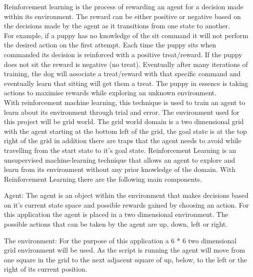 Reinforcement learning is the process of rewarding an agent for a decision made within its environment. The reward can be either positive or negative based on the decisions made by the agent as it transitions from one state to another.\\
For example, if a puppy has no knowledge of the sit command it will not perform the desired action on the first attempt. Each time the puppy sits when commanded its decision is reinforced with a positive treat/reward. If the puppy does not sit the reward is negative (no treat). Eventually after many iterations of training, the dog will associate a treat/reward with that specific command and eventually learn that sitting will get them a treat. 
The puppy in essence is taking actions to maximise rewards while exploring an unknown environment.\\
With reinforcement machine learning, this technique is used to train an agent to learn about its environment through trial and error.
The environment used for this project will be grid world. The  grid world domain is a two dimensional grid with the agent starting at the bottom left of the grid, the goal state is at the top right of the grid in addition there are traps that the agent needs to avoid while travelling from the start state to it's goal state.
Reinforcement Learning is an unsupervised machine-learning technique that allows an agent to explore and learn from its environment without any prior knowledge of the domain. With Reinforcement Learning there are the following main components.

Agent:
The agent is an object within the environment that makes decisions based on it's current state space and possible rewards gained by choosing an action. For this application the agent is placed in a two dimensional environment. The possible actions that can be taken by the agent are up, down, left or right.

The environment:
For the purpose of this application a  6 * 6 two dimensional grid environment will be used. As the script is running the agent will move from one square in the grid to the next adjacent square of up, below, to the left or the right of its current position.

